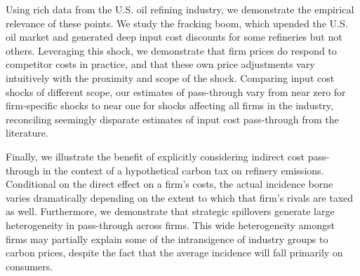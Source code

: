 \documentclass[12pt]{article}
\begin{document}
Using rich data from the U.S. oil refining industry, we demonstrate the empirical relevance of these points. We study the fracking boom, which upended the U.S. oil market and generated deep input cost discounts for some refineries but not others. Leveraging this shock, we demonstrate that firm prices do respond to competitor costs in practice, and that these own price adjustments vary intuitively with the proximity and scope of the shock. Comparing input cost shocks of different scope, our estimates of pass-through vary from near zero for firm-specific shocks to near one for shocks affecting all firms in the industry, reconciling seemingly disparate estimates of input cost pass-through from the literature.

Finally, we illustrate the benefit of explicitly considering indirect cost pass-through in the context of a hypothetical carbon tax on refinery emissions. Conditional on the direct effect on a firm's costs, the actual incidence borne varies dramatically depending on the extent to which that firm's rivals are taxed as well. Furthermore, we demonstrate that strategic spillovers generate large heterogeneity in pass-through across firms. This wide heterogeneity amongst firms may partially explain some of the intransigence of industry groups to carbon prices, despite the fact that the average incidence will fall primarily on consumers.


\clearpage




\clearpage
\clearpage
\end{document}

